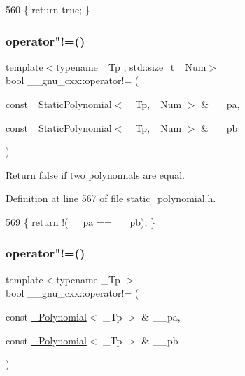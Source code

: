 \begin{DoxyCode}
560     \{ \textcolor{keywordflow}{return} \textcolor{keyword}{true}; \}
\end{DoxyCode}
\mbox{\label{namespace____gnu__cxx_a18cd3b1685ac1bb1c3f323e451e796d1}} 
\subsubsection{\texorpdfstring{operator"!=()}{operator!=()}\hspace{0.1cm}{\footnotesize\ttfamily [2/3]}}
{\footnotesize\ttfamily template$<$typename \+\_\+\+Tp , std\+::size\+\_\+t \+\_\+\+Num$>$ \\
bool \+\_\+\+\_\+gnu\+\_\+cxx\+::operator!= (\begin{DoxyParamCaption}\item[{const \hyperlink{class____gnu__cxx_1_1__StaticPolynomial}{\+\_\+\+Static\+Polynomial}$<$ \+\_\+\+Tp, \+\_\+\+Num $>$ \&}]{\+\_\+\+\_\+pa,  }\item[{const \hyperlink{class____gnu__cxx_1_1__StaticPolynomial}{\+\_\+\+Static\+Polynomial}$<$ \+\_\+\+Tp, \+\_\+\+Num $>$ \&}]{\+\_\+\+\_\+pb }\end{DoxyParamCaption})\hspace{0.3cm}{\ttfamily [inline]}}

Return false if two polynomials are equal. 

Definition at line 567 of file static\+\_\+polynomial.\+h.


\begin{DoxyCode}
569     \{ \textcolor{keywordflow}{return} !(\_\_pa == \_\_pb); \}
\end{DoxyCode}
\mbox{\label{namespace____gnu__cxx_a1279934a2d6df66704c6eab9113b0f97}} 
\subsubsection{\texorpdfstring{operator"!=()}{operator!=()}\hspace{0.1cm}{\footnotesize\ttfamily [3/3]}}
{\footnotesize\ttfamily template$<$typename \+\_\+\+Tp $>$ \\
bool \+\_\+\+\_\+gnu\+\_\+cxx\+::operator!= (\begin{DoxyParamCaption}\item[{const \hyperlink{class____gnu__cxx_1_1__Polynomial}{\+\_\+\+Polynomial}$<$ \+\_\+\+Tp $>$ \&}]{\+\_\+\+\_\+pa,  }\item[{const \hyperlink{class____gnu__cxx_1_1__Polynomial}{\+\_\+\+Polynomial}$<$ \+\_\+\+Tp $>$ \&}]{\+\_\+\+\_\+pb }\end{DoxyParamCaption})\hspace{0.3cm}{\ttfamily [inline]}}

